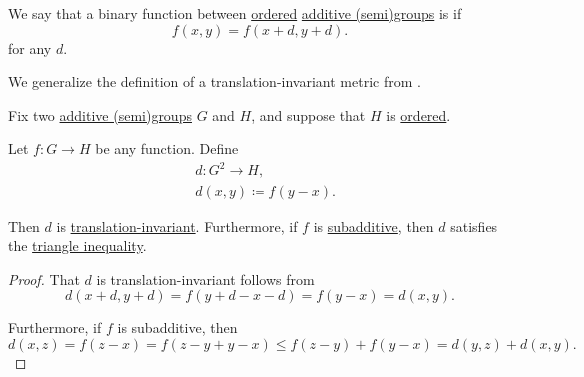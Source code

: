 \begin{definition}\label{def:translation_invariant_binary_function}\mimprovised
   We say that a binary function between \hyperref[def:ordered_semigroup]{ordered} \hyperref[con:additive_semigroup]{additive (semi)groups} is  if
  \begin{equation*}
    f(x, y) = f(x + d, y + d).
  \end{equation*}
  for any \( d \).
\end{definition}
\begin{comments}
  \item We generalize the definition of a translation-invariant metric from \cite[88]{Deimling1985NonlinearFA}.
\end{comments}

\begin{proposition}\label{thm:subadditivity_to_triangle_inequality}
  Fix two \hyperref[con:additive_semigroup]{additive (semi)groups} \( G \) and \( H \), and suppose that \( H \) is \hyperref[def:ordered_semigroup]{ordered}.

  Let \( f: G \to H \) be any function. Define
  \begin{equation*}
    \begin{aligned}
      &d: G^2 \to H, \\
      &d(x, y) \coloneqq f(y - x).
    \end{aligned}
  \end{equation*}

  Then \( d \) is \hyperref[def:translation_invariant_binary_function]{translation-invariant}. Furthermore, if \( f \) is \hyperref[def:additive_function/sub]{subadditive}, then \( d \) satisfies the \hyperref[def:triangle_inequality]{triangle inequality}.
\end{proposition}
\begin{proof}
  That \( d \) is translation-invariant follows from
  \begin{equation*}
    d(x + d, y + d) = f(y + d - x - d) = f(y - x) = d(x, y).
  \end{equation*}

  Furthermore, if \( f \) is subadditive, then
  \begin{equation*}
    d(x, z) = f(z - x) = f(z - y + y - x) \leq f(z - y) + f(y - x) = d(y, z) + d(x, y).
  \end{equation*}
\end{proof}

